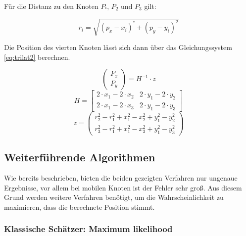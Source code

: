 Für die Distanz zu den Knoten $P_{¹}$, $P_{2}$ und $P_{3}$ gilt:

\begin{framed}
\begin{equation}
  \label{eq:trilat1}
  r_{i} = \sqrt{(p_{x} - x_{i})^{²} + (p_{y} - y_{i})^{2}}
\end{equation}
\end{framed}

Die Position des vierten Knoten lässt sich dann über das
Gleichungssystem \ref{eq:trilat2} berechnen.

\begin{framed}
\begin{equation}
  \label{eq:trilat2}
  \begin{pmatrix}
    P_{x} \\
    P_{y}
  \end{pmatrix}
  =
  H^{-1} \cdot z
\end{equation}
\begin{equation*}
  H = 
  \begin{bmatrix}
    2 \cdot x_{1} - 2 \cdot x_{2} & 2 \cdot y_{1} - 2 \cdot y_{2} \\
    2 \cdot x_{1} - 2 \cdot x_{3} & 2 \cdot y_{1} - 2 \cdot y_{3}
  \end{bmatrix}
\end{equation*}
\begin{equation*}
  z = 
  \begin{pmatrix}
    r_{2}^2 - r_{1}^2 + x_{1}^2 - x_{2}^2 + y_{1}^2 - y_{2}^2 \\
    r_{3}^2 - r_{1}^2 + x_{1}^2 - x_{3}^2 + y_{1}^2 - y_{3}^2
  \end{pmatrix}
\end{equation*}
\end{framed}


\subsection{Weiterführende Algorithmen}

Wie bereits beschrieben, bieten die beiden gezeigten Verfahren nur
ungenaue Ergebnisse, vor allem bei mobilen Knoten ist der Fehler sehr
groß. Aus diesem Grund werden weitere Verfahren benötigt, um die
Wahrscheinlichkeit zu maximieren, dass die berechnete Position stimmt.


\subsubsection{Klassische Schätzer: Maximum likelihood}

